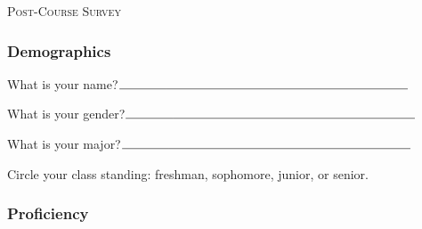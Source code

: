 \documentclass[11pt]{article}
\begin{document}
\begin{center}
\Large{\textsc{Post-Course Survey }}\\
\end{center}

\vspace{.2cm}

\subsubsection*{Demographics}

\begin{enumerate}[{$\qquad 1.]$}]
\item What is your name?$\line(1,0){38}\line(1,0){195}$
\item What is your gender?$\line(1,0){38}\line(1,0){195}$
\item What is your major?$\line(1,0){38}\line(1,0){195}$
\item Circle your class standing: freshman, sophomore, junior, or senior. 
\end{enumerate}


\subsubsection*{Proficiency}
\end{document}
